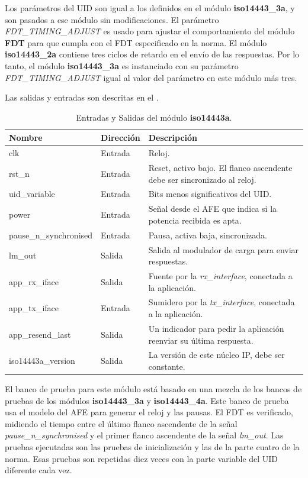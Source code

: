 \documentclass[a4paper, twoside, 11pt]{report}
\begin{document}
Los parámetros del UID son igual a los definidos en el módulo \textbf{iso14443\_3a}, y son pasados a ese módulo sin modificaciones. El parámetro \textit{FDT\_TIMING\_ADJUST} es usado para ajustar el comportamiento del módulo \textbf{FDT} para que cumpla con el FDT especificado en la norma. El módulo \textbf{iso14443\_2a} contiene tres ciclos de retardo en el envío de las respuestas. Por lo tanto, el módulo \textbf{iso14443\_3a} es instanciado con su parámetro \textit{FDT\_TIMING\_ADJUST} igual al valor del parámetro en este módulo más tres.

Las salidas y entradas son descritas en el .

\begin{table}[htb]
  \centering
  \tablezebra
  \begin{tabulary}{\linewidth}{l|l|L}
    \textbf{Nombre}&\textbf{Dirección}&\textbf{Descripción} \\
    \hline
    clk&Entrada&Reloj. \\
    rst\_n&Entrada&Reset, activo bajo. El flanco ascendente debe ser sincronizado al reloj. \\
    uid\_variable&Entrada&Bits menos significativos del UID. \\
    power&Entrada&Señal desde el AFE que indica si la potencia recibida es apta. \\
    pause\_n\_synchronised&Entrada&Pausa, activa baja, sincronizada. \\
    lm\_out&Salida&Salida al modulador de carga para enviar respuestas. \\
    app\_rx\_iface&Salida&Fuente por la \textit{rx\_interface}, conectada a la aplicación. \\
    app\_tx\_iface&Entrada&Sumidero por la \textit{tx\_interface}, conectada a la aplicación. \\
    app\_resend\_last&Salida&Un indicador para pedir la aplicación reenviar su última respuesta. \\
    iso14443a\_version&Salida&La versión de este núcleo IP, debe ser constante. \\
  \end{tabulary}
  \caption{Entradas y Salidas del módulo \textbf{iso14443a}.}
  \label{tab:ports_iso14443a}
\end{table}

El banco de prueba para este módulo está basado en una mezcla de los bancos de pruebas de los módulos \textbf{iso14443\_3a} y \textbf{iso14443\_4a}. Este banco de prueba usa el modelo del AFE para generar el reloj y las pausas. El FDT es verificado, midiendo el tiempo entre el último flanco ascendente de la señal \textit{pause\_n\_synchronised} y el primer flanco ascendente de la señal \textit{lm\_out}. Las pruebas ejecutadas son las pruebas de inicialización y las de la parte cuatro de la norma. Esas pruebas son repetidas diez veces con la parte variable del UID diferente cada vez.
\end{document}

